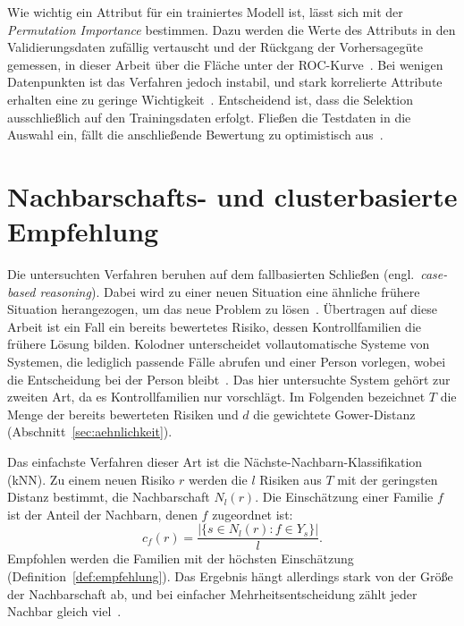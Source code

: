 Wie wichtig ein Attribut für ein trainiertes Modell ist, lässt sich mit der \emph{Permutation Importance} bestimmen.
Dazu werden die Werte des Attributs in den Validierungsdaten zufällig vertauscht und der Rückgang der Vorhersagegüte gemessen, in dieser Arbeit über die Fläche unter der ROC-Kurve~\cites[S.~1341]{Altmann2010}[S.~279]{Kaneko2022}.
Bei wenigen Datenpunkten ist das Verfahren jedoch instabil, und stark korrelierte Attribute erhalten eine zu geringe Wichtigkeit~\cite[S.~279]{Kaneko2022}.
Entscheidend ist, dass die Selektion ausschließlich auf den Trainingsdaten erfolgt.
Fließen die Testdaten in die Auswahl ein, fällt die anschließende Bewertung zu optimistisch aus~\cites[S.~6562]{Ambroise2002}[S.~1--2]{Varma2006}.

\section{Nachbarschafts- und clusterbasierte Empfehlung}\label{sec:empfehlung-grundlagen}
Die untersuchten Verfahren beruhen auf dem fallbasierten Schließen (engl.~\emph{case-based reasoning}).
Dabei wird zu einer neuen Situation eine ähnliche frühere Situation herangezogen, um das neue Problem zu lösen~\cite[S.~3]{Kolodner1992}.
Übertragen auf diese Arbeit ist ein Fall ein bereits bewertetes Risiko, dessen Kontrollfamilien die frühere Lösung bilden.
Kolodner unterscheidet vollautomatische Systeme von Systemen, die lediglich passende Fälle abrufen und einer Person vorlegen, wobei die Entscheidung bei der Person bleibt~\cite[S.~32]{Kolodner1992}.
Das hier untersuchte System gehört zur zweiten Art, da es Kontrollfamilien nur vorschlägt.
Im Folgenden bezeichnet $T$ die Menge der bereits bewerteten Risiken und $d$ die gewichtete Gower-Distanz (Abschnitt~\ref{sec:aehnlichkeit}).

Das einfachste Verfahren dieser Art ist die Nächste-Nachbarn-Klassifikation (kNN).
Zu einem neuen Risiko $r$ werden die $l$ Risiken aus $T$ mit der geringsten Distanz bestimmt, die Nachbarschaft $N_l(r)$.
Die Einschätzung einer Familie $f$ ist der Anteil der Nachbarn, denen $f$ zugeordnet ist:
\[
  c_f(r) = \frac{|\{s \in N_l(r) : f \in Y_s\}|}{l}.
\]
Empfohlen werden die Familien mit der höchsten Einschätzung (Definition~\ref{def:empfehlung}).
Das Ergebnis hängt allerdings stark von der Größe der Nachbarschaft ab, und bei einfacher Mehrheitsentscheidung zählt jeder Nachbar gleich viel~\cite[S.~16618]{Ma2017}.

